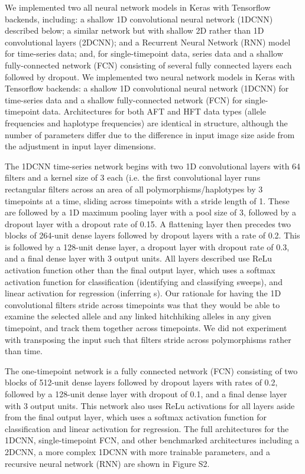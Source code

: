 We implemented two all neural network models in Keras \cite{cholletKeras2015} with Tensorflow backends, including: a shallow 1D convolutional neural network (1DCNN) described below; a similar network but with shallow 2D rather than 1D convolutional layers (2DCNN); and a Recurrent Neural Network (RNN) model for time-series data; and, for single-timepoint data, series data and a shallow fully-connected network (FCN) consisting of several fully connected layers each followed by dropout. We implemented two neural network models in Keras \cite{cholletKeras2015} with Tensorflow backends: a shallow 1D convolutional neural network (1DCNN) for time-series data and a shallow fully-connected network (FCN) for single-timepoint data. Architectures for both AFT and HFT data types (allele frequencies and haplotype frequencies) are identical in structure, although the number of parameters differ due to the difference in input image size aside from the adjustment in input layer dimensions. 

The 1DCNN time-series network begins with two 1D convolutional layers with 64 filters and a kernel size of 3 each (i.e. the first convolutional layer runs rectangular filters across an area of all polymorphisms/haplotypes by 3 timepoints at a time, sliding across timepoints with a stride length of 1. These are followed by a 1D maximum pooling layer with a pool size of 3, followed by a dropout layer with a dropout rate of 0.15. A flattening layer then precedes two blocks of 264-unit dense layers followed by dropout layers with a rate of 0.2. This is followed by a 128-unit dense layer, a dropout layer with dropout rate of 0.3, and a final dense layer with 3 output units. All layers described use ReLu activation function other than the final output layer, which uses a softmax activation function for classification (identifying and classifying sweeps), and linear activation for regression (inferring s). Our rationale for having the 1D convolutional filters stride across timepoints was that they would be able to examine the selected allele and any linked hitchhiking alleles in any given timepoint, and track them together across timepoints. We did not experiment with transposing the input such that filters stride across polymorphisms rather than time. 

The one-timepoint network is a fully connected network (FCN) consisting of two blocks of 512-unit dense layers followed by dropout layers with rates of 0.2, followed by a 128-unit dense layer with dropout of 0.1, and a final dense layer with 3 output units. This network also uses ReLu activations for all layers aside from the final output layer, which uses a softmax activation function for classification and linear activation for regression.
The full architectures for the 1DCNN, single-timepoint FCN, and other benchmarked architectures including a 2DCNN, a more complex 1DCNN with more trainable parameters, and a recursive neural network (RNN) are shown in Figure S2. \\ 
 
